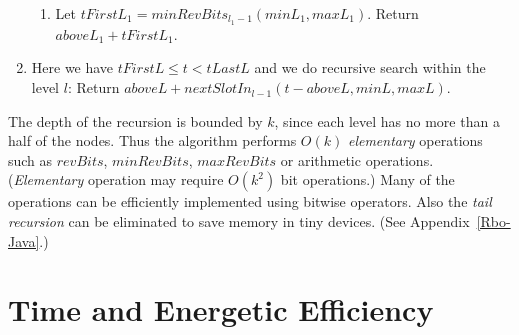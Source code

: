 \documentclass{llncs}
\begin{document}
\begin{enumerate}
\begin{enumerate}
  \item 
  Let $tFirstL_1= minRevBits_{l_1-1}( minL_1, maxL_1)$. Return $aboveL_1+tFirstL_1$.

  \end{enumerate}

\item 
Here we have $tFirstL\le t<tLastL$ and we do recursive search within the level $l$:
Return $aboveL+nextSlotIn_{l-1}(t-aboveL, minL, maxL)$.

\end{enumerate}

The depth of the recursion is bounded by $k$, since each level has no more than 
a half of the nodes.
Thus the algorithm performs $O(k)$ {\em elementary} operations
such as $revBits$, $minRevBits$, $maxRevBits$ or arithmetic operations. 
({\em Elementary} operation may require $O(k^2)$ bit operations.)
Many of the operations can be efficiently implemented using bitwise operators.
Also the {\em tail recursion} can be eliminated to save memory in tiny devices.
(See Appendix~\ref{Rbo-Java}.)




\section{Time and Energetic Efficiency}\label{reliable-efficiency-section}
\end{document}
